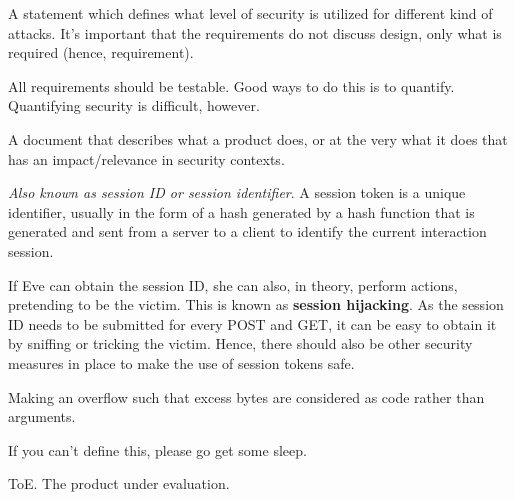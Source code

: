 \begin{definition}
    A statement which defines what level of security is utilized
    for different kind of attacks.
    It's important that the requirements do not discuss design,
    only what is required (hence, requirement).

    All requirements should be testable. Good ways to do this is 
    to quantify. Quantifying security is difficult, however.
\end{definition}

\begin{definition}
    A document that describes what a product does, 
    or at the very what it does that has an impact/relevance in security contexts.
\end{definition}

\begin{definition}\label{sessiontoken}
    \textit{Also known as session ID or session identifier}. 
    A session token is a unique identifier, usually in the form of a hash
    generated by a hash function that is generated and sent from a server to a 
    client to identify the current interaction session. 
    
    If Eve can obtain the session ID, she can also, in theory, perform 
    actions, pretending to be the victim. This is known as \textbf{session hijacking}.
    As the session ID needs to be submitted for every POST and GET, it can
    be easy to obtain it by sniffing or tricking the victim. Hence, there
    should also be other security measures in place to make the use of session
    tokens safe.
\end{definition}


\begin{definition}
    Making an overflow such that excess bytes are considered as code 
    rather than arguments.
\end{definition}

\begin{definition}
\end{definition}


\begin{definition}
    If you can't define this, please go get some sleep.
\end{definition}

\begin{definition}{ToE.}
    The product under evaluation.
\end{definition}

